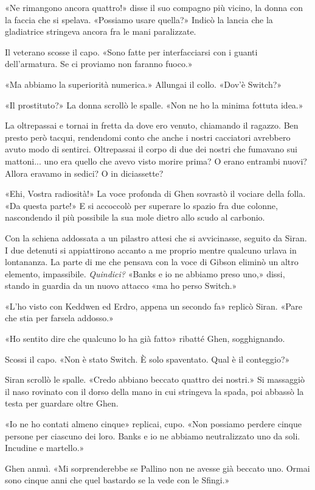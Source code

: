 «Ne rimangono ancora quattro!» disse il suo compagno più vicino, la
donna con la faccia che si spelava. «Possiamo usare quella?» Indicò la
lancia che la gladiatrice stringeva ancora fra le mani paralizzate.

Il veterano scosse il capo. «Sono fatte per interfacciarsi con i guanti
dell'armatura. Se ci proviamo non faranno fuoco.»

«Ma abbiamo la superiorità numerica.» Allungai il collo. «Dov'è Switch?»

«Il prostituto?» La donna scrollò le spalle. «Non ne ho la minima
fottuta idea.»

La oltrepassai e tornai in fretta da dove ero venuto, chiamando il
ragazzo. Ben presto però tacqui, rendendomi conto che anche i nostri
cacciatori avrebbero avuto modo di sentirci. Oltrepassai il corpo di due
dei nostri che fumavano sui mattoni... uno era quello che avevo visto
morire prima? O erano entrambi nuovi? Allora eravamo in sedici? O in
diciassette?

«Ehi, Vostra radiosità!» La voce profonda di Ghen sovrastò il vociare
della folla. «Da questa parte!» E si accoccolò per superare lo spazio
fra due colonne, nascondendo il più possibile la sua mole dietro allo
scudo al carbonio.

Con la schiena addossata a un pilastro attesi che si avvicinasse,
seguito da Siran. I due detenuti si appiattirono accanto a me proprio
mentre qualcuno urlava in lontananza. La parte di me che pensava con la
voce di Gibson eliminò un altro elemento, impassibile. \emph{Quindici?}
«Banks e io ne abbiamo preso uno,» dissi, stando in guardia da un nuovo
attacco «ma ho perso Switch.»

«L'ho visto con Keddwen ed Erdro, appena un secondo fa» replicò Siran.
«Pare che stia per farsela addosso.»

«Ho sentito dire che qualcuno lo ha già fatto» ribatté Ghen,
sogghignando.

Scossi il capo. «Non è stato Switch. È solo spaventato. Qual è il
conteggio?»

Siran scrollò le spalle. «Credo abbiano beccato quattro dei nostri.» Si
massaggiò il naso rovinato con il dorso della mano in cui stringeva la
spada, poi abbassò la testa per guardare oltre Ghen.

«Io ne ho contati almeno cinque» replicai, cupo. «Non possiamo perdere
cinque persone per ciascuno dei loro. Banks e io ne abbiamo
neutralizzato uno da soli. Incudine e martello.»

Ghen annuì. «Mi sorprenderebbe se Pallino non ne avesse già beccato uno.
Ormai sono cinque anni che quel bastardo se la vede con le Sfingi.»

